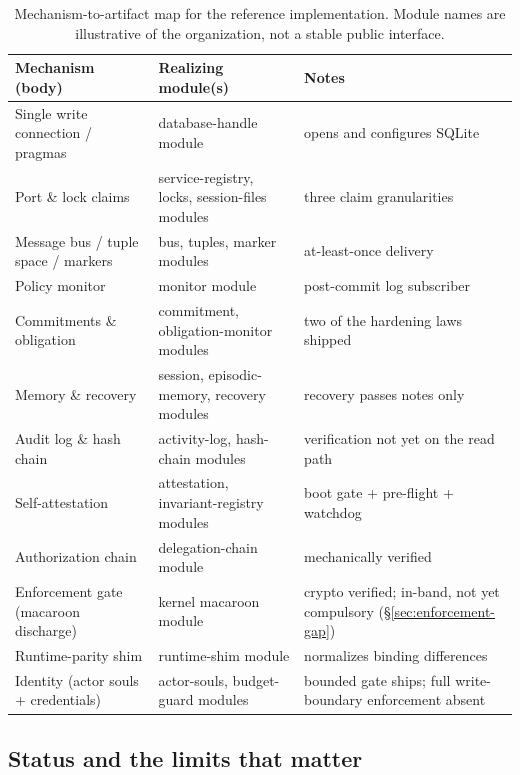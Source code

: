 \documentclass[11pt,a4paper]{article}
\theoremstyle{definition}
\theoremstyle{remark}
\begin{document}
\renewcommand{\arraystretch}{1.2}
\begin{table}[H]
\centering
\caption{Mechanism-to-artifact map for the reference implementation. Module names
are illustrative of the organization, not a stable public interface.}
\label{tab:appendix-map}
\small
\begin{tabularx}{\textwidth}{@{}>{\raggedright\arraybackslash}X >{\raggedright\arraybackslash}X >{\raggedright\arraybackslash}X@{}}
\toprule
\textbf{Mechanism (body)} & \textbf{Realizing module(s)} & \textbf{Notes} \\
\midrule
Single write connection / pragmas & database-handle module & opens and configures SQLite \\
Port \& lock claims & service-registry, locks, session-files modules & three claim granularities \\
Message bus / tuple space / markers & bus, tuples, marker modules & at-least-once delivery \\
Policy monitor & monitor module & post-commit log subscriber \\
Commitments \& obligation & commitment, obligation-monitor modules & two of the hardening laws shipped \\
Memory \& recovery & session, episodic-memory, recovery modules & recovery passes notes only \\
Audit log \& hash chain & activity-log, hash-chain modules & verification not yet on the read path \\
Self-attestation & attestation, invariant-registry modules & boot gate + pre-flight + watchdog \\
Authorization chain & delegation-chain module & mechanically verified \\
Enforcement gate (macaroon discharge) & kernel macaroon module & crypto verified; in-band, not yet compulsory (\S\ref{sec:enforcement-gap}) \\
Runtime-parity shim & runtime-shim module & normalizes binding differences \\
Identity (actor souls + credentials) & actor-souls, budget-guard modules & bounded gate ships; full write-boundary enforcement absent \\
\bottomrule
\end{tabularx}
\end{table}

\subsection{Status and the limits that matter}
\end{document}
